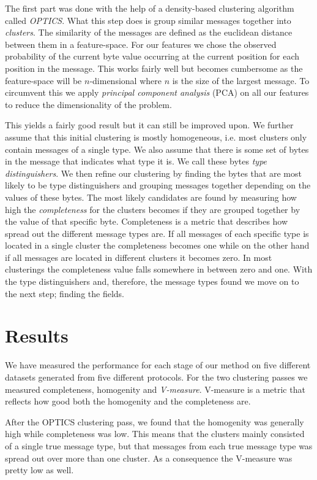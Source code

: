 \documentclass[a4paper,twocolumn]{article}
\begin{document}
The first part was done with the help of a density-based clustering algorithm
called \emph{OPTICS}. What this step does is group similar messages together into
\emph{clusters}. The similarity of the messages are defined as the euclidean
distance between them in a feature-space. For our features we chose the
observed probability of the current byte value occurring at the current
position for each position in the message. This works fairly well but becomes
cumbersome as the feature-space will be $n$-dimensional where $n$ is the size
of the largest message. To circumvent this we apply
\emph{principal component analysis} (PCA) on all our features to reduce the
dimensionality of the problem.

This yields a fairly good result but it can still be improved upon. We further
assume that this initial clustering is mostly homogeneous, i.e. most clusters
only contain messages of a single type. We also assume that there is some set
of bytes in the message that indicates what type it is. We call these bytes
\emph{type distinguishers}. We then refine our clustering by finding the bytes
that are most likely to be type distinguishers and grouping messages together
depending on the values of these bytes. The most likely candidates are found by
measuring how high the \emph{completeness} for the clusters becomes if they are
grouped together by the value of that specific byte. Completeness is a metric
that describes how spread out the different message types are. If all messages
of each specific type is located in a single cluster the completeness becomes
one while on the other hand if all messages are located in different clusters
it becomes zero. In most clusterings the completeness value falls somewhere
in between zero and one. With the type distinguishers and, therefore, the
message types found we move on to the next step; finding the fields.

\section{Results}
We have measured the performance for each stage of our method on five
different datasets generated from five different protocols. For the two
clustering passes we measured completeness, homogenity and \emph{V-measure}.
V-measure is a metric that reflects how good both the homogenity and the
completeness are. 

After the OPTICS clustering pass, we found that the homogenity was generally
high while completeness was low. This means that the clusters mainly
consisted of a single true message type, but that messages from each true
message type was spread out over more than one cluster. As a consequence the
V-measure was pretty low as well.
\end{document}
